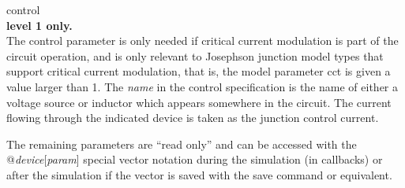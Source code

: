 \begin{description}
\item{\vt control}\\
{\bf level 1 only.}\\
The {\vt control} parameter is only needed if critical current
modulation is part of the circuit operation, and is only relevant to
Josephson junction model types that support critical current
modulation, that is, the model parameter {\vt cct} is given a value
larger than 1.  The {\it name} in the {\vt control} specification is
the name of either a voltage source or inductor which appears
somewhere in the circuit.  The current flowing through the indicated
device is taken as the junction control current.
\end{description}

The remaining parameters are ``read only'' and can be accessed with
the {\vt @}{\it device\/}[{\it param\/}] special vector notation
during the simulation (in callbacks) or after the simulation if the
vector is saved with the {\cb save} command or equivalent.

